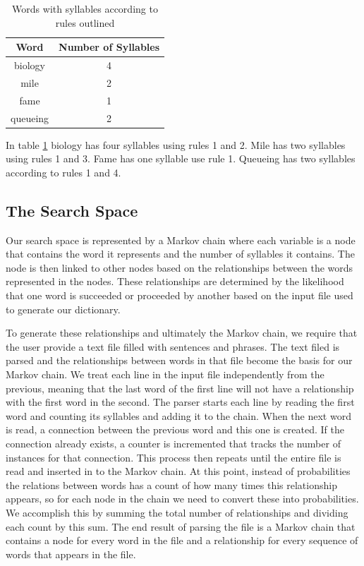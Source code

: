 \documentclass[]{article}
\begin{document}
\begin{table}[H]
\begin{center}
	\begin{tabular}{| c | c |}
		\hline
		Word & Number of Syllables \\
		\hline
		biology & 4 \\
		\hline
		mile & 2 \\
		\hline
		fame & 1 \\
		\hline
		queueing & 2 \\
		\hline
	\end{tabular}
\caption{Words with syllables according to rules outlined}
\label{table:syllables}
\end{center}
\end{table}

In table \ref{table:syllables} biology has four syllables using rules 1 and 2. Mile has two syllables using rules 1 and 3. Fame has one syllable use rule 1. Queueing has two syllables according to rules 1 and 4.
\subsection{The Search Space}
Our search space is represented by a Markov chain where each variable is a node that contains the word it represents and the number of syllables it contains. The node is then linked to other nodes based on the relationships between the words represented in the nodes. These relationships are determined by the likelihood that one word is succeeded or proceeded by another based on the input file used to generate our dictionary.

To generate these relationships and ultimately the Markov chain, we require that the user provide a text file filled with sentences and phrases. The text filed is parsed and the relationships between words in that file become the basis for our Markov chain. We treat each line in the input file independently from the previous, meaning that the last word of the first line will not have a relationship with the first word in the second. The parser starts each line by reading the first word and counting its syllables and adding it to the chain. When the next word is read, a connection between the previous word and this one is created. If the connection already exists, a counter is incremented that tracks the number of instances for that connection. This process then repeats until the entire file is read and inserted in to the Markov chain. At this point, instead of probabilities the relations between words has a count of how many times this relationship appears, so for each node in the chain we need to convert these into probabilities. We accomplish this by summing the total number of relationships and dividing each count by this sum. The end result of parsing the file is a Markov chain that contains a node for every word in the file and a relationship for every sequence of words that appears in the file.
\end{document}

